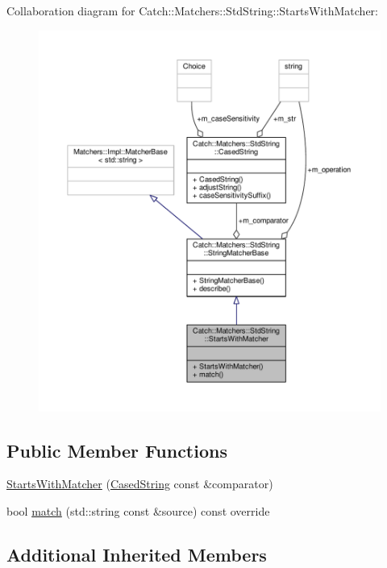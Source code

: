 Collaboration diagram for Catch\-:\-:Matchers\-:\-:Std\-String\-:\-:Starts\-With\-Matcher\-:
\nopagebreak
\begin{figure}[H]
\begin{center}
\leavevmode
\includegraphics[width=350pt]{struct_catch_1_1_matchers_1_1_std_string_1_1_starts_with_matcher__coll__graph}
\end{center}
\end{figure}
\subsection*{Public Member Functions}
\begin{DoxyCompactItemize}
\item 
\hyperlink{struct_catch_1_1_matchers_1_1_std_string_1_1_starts_with_matcher_a7b86f258bdbd131a6e7bcd94a8977325}{Starts\-With\-Matcher} (\hyperlink{struct_catch_1_1_matchers_1_1_std_string_1_1_cased_string}{Cased\-String} const \&comparator)
\item 
bool \hyperlink{struct_catch_1_1_matchers_1_1_std_string_1_1_starts_with_matcher_a7da4747aed0c48989d8be59a89e2b7fb}{match} (std\-::string const \&source) const override
\end{DoxyCompactItemize}
\subsection*{Additional Inherited Members}


